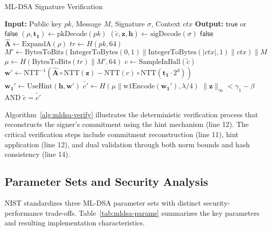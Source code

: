 \documentclass[journal=tches,final]{iacrtrans}
\newcommand{\Input}[1]{\STATE \textbf{Input:} #1}
\newcommand{\Output}[1]{\STATE \textbf{Output:} #1}
\begin{document}
\begin{algorithm}[h]
  \caption{ML-DSA Signature Verification}
  \label{alg:mldsa-verify}
  \begin{algorithmic}[1]
    \Input{Public key $pk$, Message $M$, Signature $\sigma$, Context $ctx$}
    \Output{$\mathsf{true}$ or $\mathsf{false}$}
    \STATE $(\rho, \mathbf{t_1}) \leftarrow \text{pkDecode}(pk)$
    \STATE $(\tilde{c}, \mathbf{z}, \mathbf{h}) \leftarrow \text{sigDecode}(\sigma)$
    \RETURN $\mathsf{false}$ 
    \ENDIF
    \STATE $\hat{\mathbf{A}} \leftarrow \text{ExpandA}(\rho)$
    \STATE $tr \leftarrow H(pk, 64)$
    \STATE $M' \leftarrow \text{BytesToBits}(\text{IntegerToBytes}(0,1) \| \text{IntegerToBytes}(|ctx|,1) \| ctx) \| M$
    \STATE $\mu \leftarrow H(\text{BytesToBits}(tr) \| M', 64)$
    \STATE $c \leftarrow \text{SampleInBall}(\tilde{c})$
    \STATE $\mathbf{w'} \leftarrow \text{NTT}^{-1}(\hat{\mathbf{A}} \circ \text{NTT}(\mathbf{z}) - \text{NTT}(c) \circ \text{NTT}(\mathbf{t_1} \cdot 2^d))$
    \STATE $\mathbf{w_1'} \leftarrow \text{UseHint}(\mathbf{h}, \mathbf{w'})$
    \STATE $\tilde{c'} \leftarrow H(\mu \| \text{w1Encode}(\mathbf{w_1'}), \lambda/4)$
    \RETURN $\|\mathbf{z}\|_\infty < \gamma_1 - \beta$ AND $\tilde{c} = \tilde{c'}$
  \end{algorithmic}
\end{algorithm}

Algorithm~\ref{alg:mldsa-verify} illustrates the deterministic verification process that reconstructs the signer's commitment using the hint mechanism (line 12). The critical verification steps include commitment reconstruction (line 11), hint application (line 12), and dual validation through both norm bounds and hash consistency (line 14).

\subsection{Parameter Sets and Security Analysis}

NIST standardizes three ML-DSA parameter sets with distinct security-performance trade-offs. Table~\ref{tab:mldsa-params} summarizes the key parameters and resulting implementation characteristics.
\end{document}
